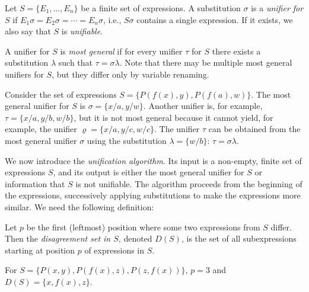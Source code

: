 \begin{definition}[Unification]
    Let $S=\{E_1,\dots,E_n\}$ be a finite set of expressions. A substitution $\sigma$ is a \emph{unifier for $S$} if $E_1\sigma=E_2\sigma=\cdots =E_n\sigma$, i.e., $S\sigma$ contains a single expression. If it exists, we also say that $S$ is \emph{unifiable}. 
    
    A unifier for $S$ is \emph{most general} if for every unifier $\tau$ for $S$ there exists a substitution $\lambda$ such that $\tau=\sigma\lambda$. Note that there may be multiple most general unifiers for $S$, but they differ only by variable renaming.
\end{definition}

\begin{example}
   Consider the set of expressions $S=\{P(f(x),y),P(f(a),w)\}$. The most general unifier for $S$ is $\sigma=\{x/a,y/w\}$. Another unifier is, for example, $\tau=\{x/a,y/b,w/b\}$, but it is not most general because it cannot yield, for example, the unifier $\varrho=\{x/a, y/c, w/c\}$. The unifier $\tau$ can be obtained from the most general unifier $\sigma$ using the substitution $\lambda=\{w/b\}$: $\tau=\sigma\lambda$.
\end{example}

We now introduce the \emph{unification algorithm}. Its input is a non-empty, finite set of expressions $S$, and its output is either the most general unifier for $S$ or information that $S$ is not unifiable. The algorithm proceeds from the beginning of the expressions, successively applying substitutions to make the expressions more similar. We need the following definition:

Let $p$ be the first (leftmost) position where some two expressions from $S$ differ. Then the \emph{disagreement set in $S$}, denoted $D(S)$, is the set of all subexpressions starting at position $p$ of expressions in $S$.

\begin{example}
For $S=\{P(x,y),P(f(x),z),P(z,f(x))\}$, $p=3$ and $D(S)=\{x,f(x),z\}$.  
\end{example}

